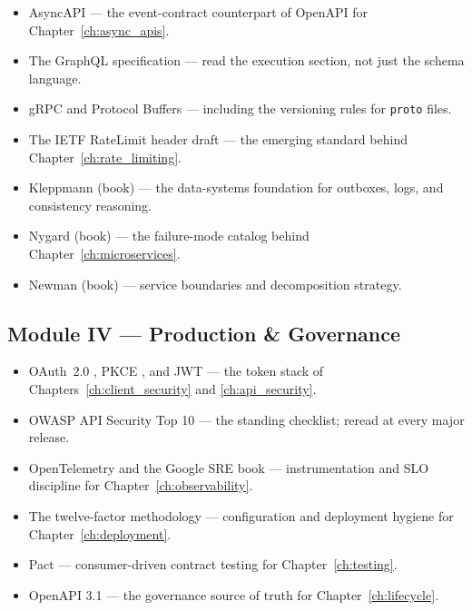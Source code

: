 \begin{itemize}
  \item AsyncAPI \cite{asyncapi} --- the event-contract counterpart of
        OpenAPI for Chapter~\ref{ch:async_apis}.
  \item The GraphQL specification \cite{graphqlspec} --- read the execution
        section, not just the schema language.
  \item gRPC \cite{grpcdocs} and Protocol Buffers \cite{protobufdocs} ---
        including the versioning rules for \texttt{proto} files.
  \item The IETF RateLimit header draft \cite{ietf_ratelimit_headers} ---
        the emerging standard behind Chapter~\ref{ch:rate_limiting}.
  \item Kleppmann \cite{kleppmann2017ddia} (book) --- the data-systems
        foundation for outboxes, logs, and consistency reasoning.
  \item Nygard \cite{nygard2018releaseit} (book) --- the failure-mode
        catalog behind Chapter~\ref{ch:microservices}.
  \item Newman \cite{newman2021microservices} (book) --- service boundaries
        and decomposition strategy.
\end{itemize}

\subsection*{Module IV --- Production \& Governance}

\begin{itemize}
  \item OAuth~2.0 \cite{rfc6749}, PKCE \cite{rfc7636}, and JWT
        \cite{rfc7519} --- the token stack of
        Chapters~\ref{ch:client_security} and \ref{ch:api_security}.
  \item OWASP API Security Top 10 \cite{owaspapisecurity} --- the standing
        checklist; reread at every major release.
  \item OpenTelemetry \cite{opentelemetrydocs} and the Google SRE book
        \cite{beyer2016sre} --- instrumentation and SLO discipline for
        Chapter~\ref{ch:observability}.
  \item The twelve-factor methodology \cite{twelvefactor} --- configuration
        and deployment hygiene for Chapter~\ref{ch:deployment}.
  \item Pact \cite{pactdocs} --- consumer-driven contract testing for
        Chapter~\ref{ch:testing}.
  \item OpenAPI 3.1 \cite{openapi31} --- the governance source of truth for
        Chapter~\ref{ch:lifecycle}.
\end{itemize}

